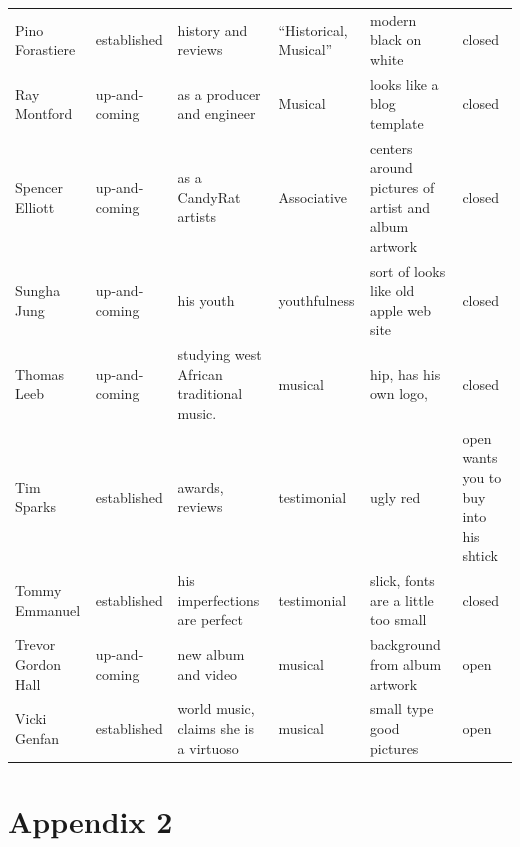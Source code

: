 \documentclass[unicode,hyperfootnotes=false,xetex,colorlinks=true,nofonts,nobib]{tufte-handout}
\begin{document}
\begin{longtable}{p{} p{} p{} p{} p{} p{}}
Pino Forastiere & established & history and reviews & ``Historical, Musical'' & modern black on white & closed\\
Ray Montford & up-and-coming & as a producer and engineer & Musical & looks like a blog template & closed\\
Spencer Elliott & up-and-coming & as a CandyRat artists & Associative & centers around pictures of artist and album artwork & closed\\
Sungha Jung & up-and-coming & his youth & youthfulness & sort of looks like old apple web site & closed\\
Thomas Leeb & up-and-coming & studying west African traditional music.  & musical & hip, has his own logo,  & closed\\
Tim Sparks & established & awards, reviews & testimonial & ugly red & open wants you to buy into his shtick\\
Tommy Emmanuel & established & his imperfections are perfect & testimonial & slick, fonts are a little too small & closed\\
Trevor Gordon Hall & up-and-coming & new album and video & musical & background from album artwork & open\\
Vicki Genfan & established & world music, claims she is a virtuoso & musical & small type good pictures & open\\
\end{longtable}
\clearpage
\section{Appendix 2}
\label{sec:appendix-2}
\end{document}
